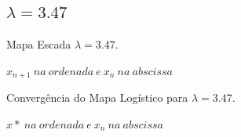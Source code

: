 \documentclass[pdftex,12pt,a4paper]{article}
\begin{document}
\begin{figure}
\subsection{$\lambda = 3.47$}
\centering
\caption{Mapa Escada $\lambda = 3.47$.}
\caption*{$x_{n+1}\ na\ ordenada\ e\ x_{n}\ na\ abscissa$ }
\end{figure}

\begin{figure}
\centering
\caption{Convergência do Mapa Logístico para $\lambda = 3.47$.}
\caption*{$x*\ na\ ordenada\ e\ x_{n}\ na\ abscissa$ }
\end{figure}
\end{document}
